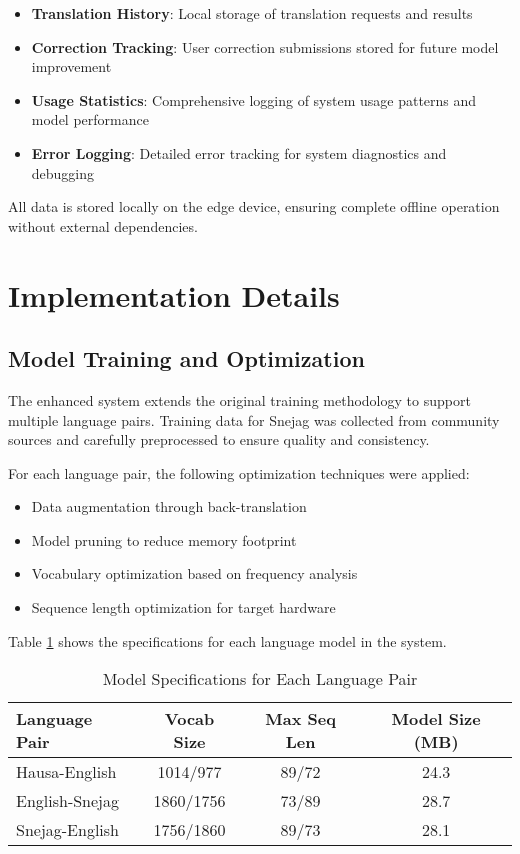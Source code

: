 \documentclass[conference]{IEEEtran}
\begin{document}
\begin{itemize}
    \item \textbf{Translation History}: Local storage of translation requests and results
    \item \textbf{Correction Tracking}: User correction submissions stored for future model improvement
    \item \textbf{Usage Statistics}: Comprehensive logging of system usage patterns and model performance
    \item \textbf{Error Logging}: Detailed error tracking for system diagnostics and debugging
\end{itemize}

All data is stored locally on the edge device, ensuring complete offline operation without external dependencies.

\section{Implementation Details}

\subsection{Model Training and Optimization}

The enhanced system extends the original training methodology to support multiple language pairs. Training data for Snejag was collected from community sources and carefully preprocessed to ensure quality and consistency.

For each language pair, the following optimization techniques were applied:

\begin{itemize}
    \item Data augmentation through back-translation
    \item Model pruning to reduce memory footprint
    \item Vocabulary optimization based on frequency analysis
    \item Sequence length optimization for target hardware
\end{itemize}

Table \ref{tab:model-specs} shows the specifications for each language model in the system.

\begin{table}[htbp]
\centering
\caption{Model Specifications for Each Language Pair}
\label{tab:model-specs}
\begin{tabular}{@{}lccc@{}}
\toprule
Language Pair & Vocab Size & Max Seq Len & Model Size (MB) \\
\midrule
Hausa-English & 1014/977 & 89/72 & 24.3 \\
English-Snejag & 1860/1756 & 73/89 & 28.7 \\
Snejag-English & 1756/1860 & 89/73 & 28.1 \\
\bottomrule
\end{tabular}
\end{table}
\end{document}
